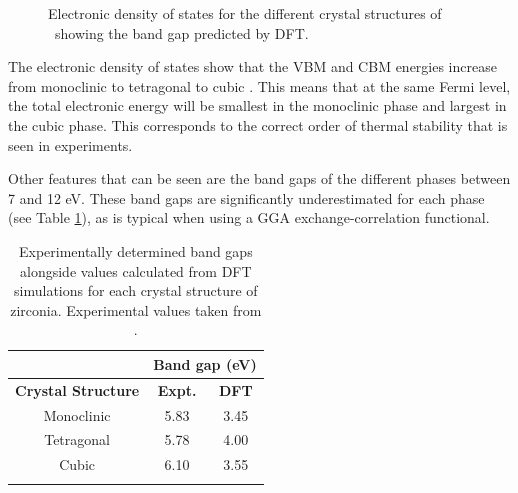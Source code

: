 \begin{figure}[ht] %
\begin{center}
		\caption{Electronic density of states for the different crystal structures of \zirconia\ showing the band gap predicted by DFT.}
		\label{figure:densityofstates}
	\end{center}
\end{figure}

The electronic density of states show that the VBM and CBM energies increase from monoclinic to tetragonal to cubic \zirconia . This means that at the same Fermi level, the total electronic energy will be smallest in the monoclinic phase and largest in the cubic phase. This corresponds to the correct order of thermal stability that is seen in experiments. 

Other features that can be seen are the band gaps of the different phases between 7 and 12 eV. These band gaps are significantly underestimated for each phase (see Table \ref{table:bandgap}), as is typical when using a GGA exchange-correlation functional.

\begin{table}[ht] %
\onehalfspacing
\centering
\caption[Experimentally determined band gaps alongside values calculated from DFT simulations for each crystal structure of zirconia.]{Experimentally determined band gaps alongside values calculated from DFT simulations for each crystal structure of zirconia. Experimental values taken from \cite{French1994}.}
\begin{tabular}{ccc}
{\bf }                                       & \multicolumn{2}{c}{{\bf Band gap (eV)}}      \\ \hline
\multicolumn{1}{c}{{\bf Crystal Structure}} & \multicolumn{1}{c}{{\bf Expt.}} & {\bf DFT} \\ \hline
\multicolumn{1}{c}{Monoclinic}              & \multicolumn{1}{c}{5.83}        & 3.45      \\
\multicolumn{1}{c}{Tetragonal}              & \multicolumn{1}{c}{5.78}        & 4.00      \\
\multicolumn{1}{c}{Cubic}                   & \multicolumn{1}{c}{6.10}         &   3.55 \\ \hline
\label{table:bandgap}
\end{tabular}
\end{table}

